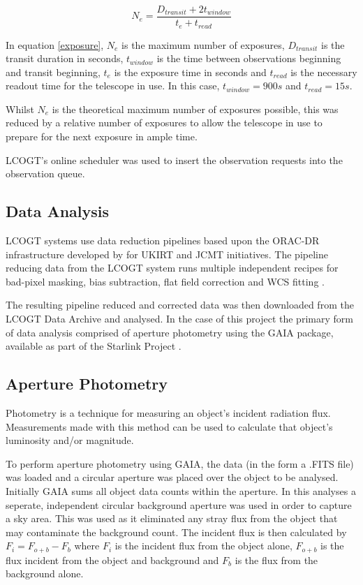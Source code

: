 \documentclass{report}
\begin{document}
\begin{equation} \label{exposure}
    N_{e} = \frac{D_{transit} + 2t_{window}}{t_{e} + t_{read}}
\end{equation}

In equation \ref{exposure}, $N_{e}$ is the maximum number of exposures, $D_{transit}$ is the transit duration in seconds, $t_{window}$ is the time between observations beginning and transit beginning, $t_{e}$ is the exposure time in seconds and $t_{read}$ is the necessary readout time for the telescope in use. In this case, $t_{window}=900s$ and $t_{read}=15s$.

Whilst $N_{e}$ is the theoretical maximum number of exposures possible, this was reduced by a relative number of exposures to allow the telescope in use to prepare for the next exposure in ample time. 

LCOGT's online scheduler was used to insert the observation requests into the observation queue.

\subsection{Data Analysis}
LCOGT systems use data reduction pipelines based upon the ORAC-DR infrastructure developed by \textcite{orac-dr} for UKIRT and JCMT initiatives. The pipeline reducing data from the LCOGT system runs multiple independent recipes for bad-pixel masking, bias subtraction, flat field correction and WCS fitting \parencite{pipeline}.  

The resulting pipeline reduced and corrected data was then downloaded from the LCOGT Data Archive and analysed. In the case of this project the primary form of data analysis comprised of aperture photometry using the GAIA package, available as part of the Starlink Project \parencite{starlink}.

\subsection{Aperture Photometry}
Photometry is a technique for measuring an object's incident radiation flux. Measurements made with this method can be used to calculate that object's luminosity and/or magnitude.

To perform aperture photometry using GAIA, the data (in the form a .FITS file) was loaded and a circular aperture was placed over the object to be analysed. Initially GAIA sums all object data counts within the aperture. In this analyses a seperate, independent circular background aperture was used in order to capture a sky area. This was used as it eliminated any stray flux from the object that may contaminate the background count. The incident flux is then calculated by $F_{i} = F_{o+b} - F_{b}$ where $F_{i}$ is the incident flux from the object alone, $F_{o+b}$ is the flux incident from the object and background and $F_{b}$ is the flux from the background alone.
\end{document}
